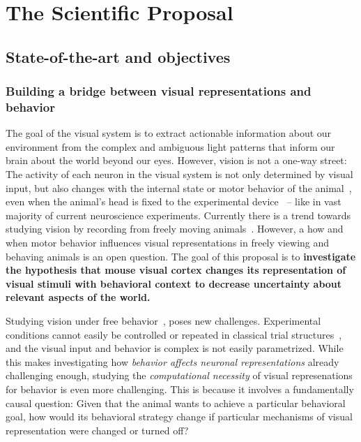 \documentclass[B2,COG]{ercgrant}
\begin{document}
\maketitle



\chapter{The Scientific Proposal}


\section{State-of-the-art and objectives}\label{sec:stateofart}
\subsection{Building a bridge between visual representations and behavior}
The goal of the visual system is to extract actionable information about our environment from the complex and ambiguous light patterns that inform our brain about the world beyond our eyes.
However, vision is not a one-way street: The activity of each neuron in the visual system is not only determined by visual input, but also changes with the internal state or motor behavior of the animal~\parencite{Niell2010-bs, Musall2019-kd, Erisken2014-un, Franke2022-do}, even when the animal's head is fixed to the experimental device~\parencite{Stringer2019-lt, Musall2019-kd} -- like in vast majority of current neuroscience experiments.
Currently there is a trend towards studying vision by recording from freely moving animals~\parencite[\eg][]{Parker2022-ac,Holmgren2021-jv}. 
However, a how and when motor behavior influences visual representations in freely viewing and behaving animals is an open question. 
%
The goal of this proposal is to \textbf{investigate the hypothesis that mouse visual cortex changes its representation of visual stimuli with behavioral context to decrease uncertainty about relevant aspects of the world.} 

Studying vision under free behavior~\parencite{Parker2022-ac}, poses new challenges. 
Experimental conditions cannot easily be controlled or repeated in classical trial structures~\parencite{Huk2018-ez}, and the visual input and behavior is complex is not easily parametrized. 
While this makes investigating how \textit{behavior affects neuronal representations} already challenging enough, studying the \textit{computational necessity} of visual represenations for behavior is even more challenging.
This is because it involves a fundamentally causal question: Given that the animal wants to achieve a particular behavioral goal, how would its behavioral strategy change if particular mechanisms of visual representation were changed or turned off?
\end{document}
